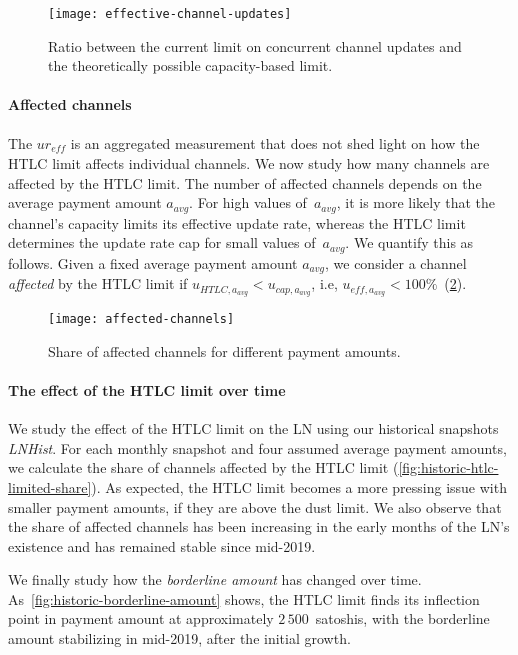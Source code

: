 \begin{figure}[tb]
	\centering
	\texttt{[image: effective-channel-updates]}
	\caption{Ratio between the current limit on concurrent channel updates and the theoretically possible capacity-based limit.}
	\label{fig:effective-channel-updates}
\end{figure}

\paragraph{Affected channels}
The $ur_\textit{eff}$ is an aggregated measurement that does not shed light on how the HTLC limit affects individual channels. 
We now study how many channels are affected by the HTLC limit.
The number of affected channels depends on the average payment amount $a_\textit{avg}$.
For high values of~$a_\textit{avg}$, it is more likely that the channel's capacity limits its effective update rate, whereas the HTLC limit determines the update rate cap for small values of~$a_\textit{avg}$.
We quantify this as follows.
Given a fixed average payment amount $a_\textit{avg}$, we consider a channel \textit{affected} by the HTLC limit if $u_{\textit{HTLC},a_\textit{avg}} < u_{\textit{cap},a_\textit{avg}}$, i.e, $u_{\textit{eff},a_\textit{avg}} < 100\%$~(\cref{fig:affected-channels}).

\begin{figure}[tb]
	\centering
	\texttt{[image: affected-channels]}
	\caption{Share of affected channels for different payment amounts.}
	\label{fig:affected-channels}
\end{figure}


\paragraph{The effect of the HTLC limit over time}

We study the effect of the HTLC limit on the LN using our historical snapshots \emph{LNHist}.
For each monthly snapshot and four assumed average payment amounts, we calculate the share of channels affected by the HTLC limit (\cref{fig:historic-htlc-limited-share}).
As expected, the HTLC limit becomes a more pressing issue with smaller payment amounts, if they are above the dust limit.
We also observe that the share of affected channels has been increasing in the early months of the LN's existence and has remained stable since mid-2019.

We finally study how the \textit{borderline amount} has changed over time.
As~\cref{fig:historic-borderline-amount} shows, the HTLC limit finds its inflection point in payment amount at approximately $2\,500$~satoshis, with the borderline amount stabilizing in mid-2019, after the initial growth.

